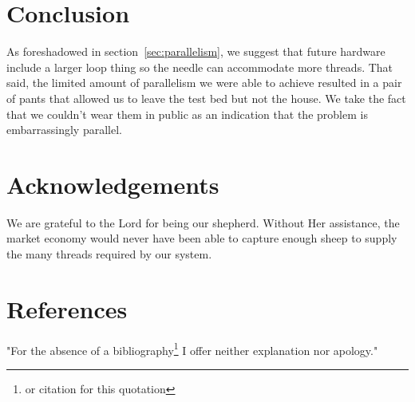 \documentclass[letterpaper,12pt]{article}
\begin{document}
\begin{multicols}{2}
\section{Conclusion}
As foreshadowed in section~\ref{sec:parallelism}, we suggest that future hardware include a larger loop thing so the needle can accommodate more threads.
That said, the limited amount of parallelism we were able to achieve resulted in a pair of pants that allowed us to leave the test bed but not the house.
We take the fact that we couldn't wear them in public as an indication that the problem is embarrassingly parallel.

\section*{Acknowledgements}
We are grateful to the Lord for being our shepherd.
Without Her assistance, the market economy would never have been able to capture enough sheep to supply the many threads required by our system.

\section*{References}
"For the absence of a bibliography\footnote{or citation for this quotation} I offer neither explanation nor apology."

\end{multicols}
\end{document}
